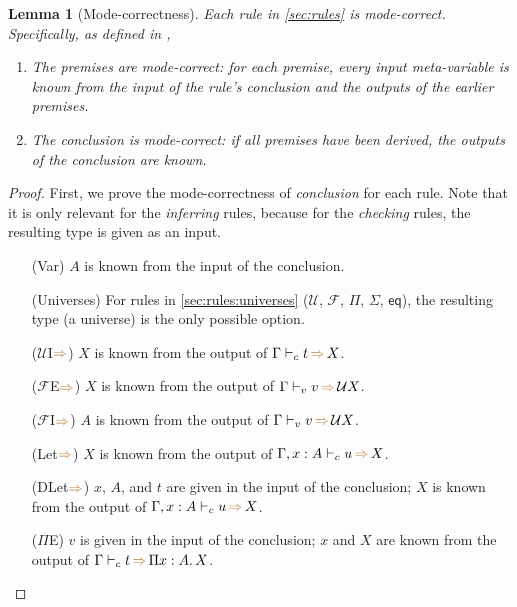 \documentclass[a4,natbib=false]{article}
\newtheorem{lemma}{Lemma}
\newcommand{\ctov}{\mathcal{U}}
\newcommand{\vtoc}{\mathcal{F}}
\newcommand{\comptoval}[1]{\ctov #1}
\newcommand{\pitype}[2]{\Pi {#1}.\,#2}
\newcommand{\infers}{{\color{brown} \Rightarrow}}
\newcommand{\judgecInfer}[3]{{#1} \vdash_{c} {#2} \, \infers \, {#3}}
\newcommand{\judgevInfer}[3]{{#1} \vdash_{v} {#2} \, \infers \, {#3}}
\begin{document}
\begin{lemma}[Mode-correctness]
  Each rule in \cref{sec:rules} is mode-correct. Specifically, as defined in \cite{dunfield2021:bidirectional},
  \begin{enumerate}
    \item The premises are mode-correct: for each premise, every input meta-variable is known from the input of the rule's conclusion and the outputs of the earlier premises.
    \item The conclusion is mode-correct: if all premises have been derived, the outputs of the conclusion are known.
  \end{enumerate}
\end{lemma}
\begin{proof}
  First, we prove the mode-correctness of \emph{conclusion} for each rule.
  Note that it is only relevant for the \emph{inferring} rules, because for the \emph{checking} rules, the resulting type is given as an input.

  \begin{itemize}
  \item[(Var)]
    $A$ is known from the input of the conclusion.
  \item[(Universes)]
    For rules in \cref{sec:rules:universes} ($\ctov$, $\vtoc$, $\Pi$,
    $\Sigma$, $\mathsf{eq}$), the resulting type (a universe) is the only
    possible option.

  \item[($\ctov$I$\infers$)]
    $X$ is known from the output of $\judgecInfer{\Gamma}{t}{X}$.

  \item[($\vtoc$E$\infers$)]
    $X$ is known from the output of $\judgevInfer{\Gamma}{v}{\comptoval{X}}$.

  \item[($\vtoc$I$\infers$)]
    $A$ is known from the output of $\judgevInfer{\Gamma}{v}{\comptoval{X}}$.

  \item[(Let$\infers$)]
    $X$ is known from the output of $\judgecInfer{\Gamma, x : A}{u}{X}$.

  \item[(DLet$\infers$)]
    $x$, $A$, and $t$ are given in the input of the conclusion; $X$ is known
    from the output of $\judgecInfer{\Gamma, x:A}{u}{X}$.

  \item[($\Pi$E)]
    $v$ is given in the input of the conclusion; $x$ and $X$ are known from the
    output of $\judgecInfer{\Gamma}{t}{\pitype{x:A}{X}}$.


\end{itemize}
\end{proof}
\end{document}
